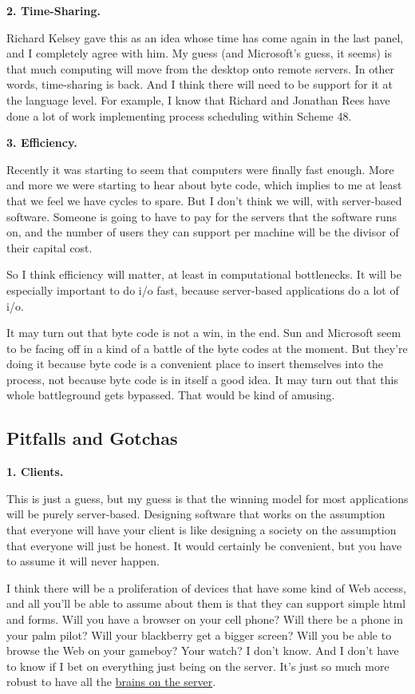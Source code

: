 \textbf{2. Time-Sharing.}

Richard Kelsey gave this as an idea whose time has come again in the
last panel, and I completely agree with him. My guess (and Microsoft's
guess, it seems) is that much computing will move from the desktop onto
remote servers. In other words, time-sharing is back. And I think there
will need to be support for it at the language level. For example, I
know that Richard and Jonathan Rees have done a lot of work implementing
process scheduling within Scheme 48.

\textbf{3. Efficiency.}

Recently it was starting to seem that computers were finally fast
enough. More and more we were starting to hear about byte code, which
implies to me at least that we feel we have cycles to spare. But I don't
think we will, with server-based software. Someone is going to have to
pay for the servers that the software runs on, and the number of users
they can support per machine will be the divisor of their capital cost.

So I think efficiency will matter, at least in computational
bottlenecks. It will be especially important to do i/o fast, because
server-based applications do a lot of i/o.

It may turn out that byte code is not a win, in the end. Sun and
Microsoft seem to be facing off in a kind of a battle of the byte codes
at the moment. But they're doing it because byte code is a convenient
place to insert themselves into the process, not because byte code is in
itself a good idea. It may turn out that this whole battleground gets
bypassed. That would be kind of amusing.

\subsection{Pitfalls and Gotchas}\label{pitfalls-and-gotchas}

\textbf{1. Clients.}

This is just a guess, but my guess is that the winning model for most
applications will be purely server-based. Designing software that works
on the assumption that everyone will have your client is like designing
a society on the assumption that everyone will just be honest. It would
certainly be convenient, but you have to assume it will never happen.

I think there will be a proliferation of devices that have some kind of
Web access, and all you'll be able to assume about them is that they can
support simple html and forms. Will you have a browser on your cell
phone? Will there be a phone in your palm pilot? Will your blackberry
get a bigger screen? Will you be able to browse the Web on your gameboy?
Your watch? I don't know. And I don't have to know if I bet on
everything just being on the server. It's just so much more robust to
have all the \href{road.html}{brains on the server}.


